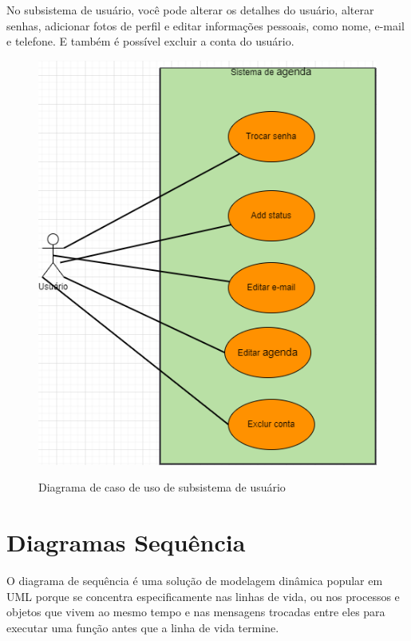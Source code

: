 No subsistema de usuário, você pode alterar os detalhes do usuário, alterar senhas, adicionar fotos de perfil e editar informações pessoais, como nome, e-mail e telefone. E também é possível excluir a conta do usuário.
\begin{figure}[H]
      \begin{center}
            \caption{Diagrama de caso de uso de subsistema de usuário} \label{afp}
            \includegraphics[width=15cm]{Pictures/diagram/casodeuso2.drawio.png} \\


      \end{center}
\end{figure}

\section{Diagramas Sequ\^{e}ncia}
O diagrama de sequência é uma solução de modelagem dinâmica popular em UML porque se concentra especificamente nas linhas de vida, ou nos processos e objetos que vivem ao mesmo tempo e nas mensagens trocadas entre eles para executar uma função antes que a linha de vida termine.

